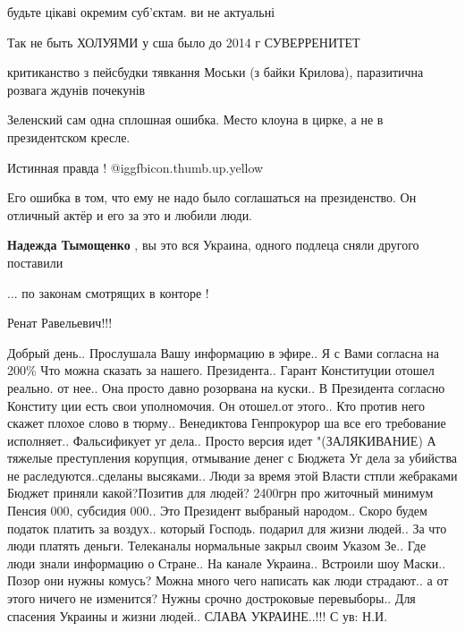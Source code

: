 \begin{itemize}
будьте цікаві окремим суб'єктам. ви не актуальні

Так не быть ХОЛУЯМИ у сша было до 2014 г СУВЕРРЕНИТЕТ

критиканство з пейсбудки тявкання Моськи (з байки Крилова), паразитична розвага ждунів почекунів

Зеленский сам одна сплошная ошибка. Место клоуна в цирке, а не в президентском кресле.

Истинная правда ! @igg{fbicon.thumb.up.yellow} 


Его ошибка в том, что ему не надо было соглашаться на президенство. Он отличный
актёр и его за это и любили люди.

\begin{itemize} %
\textbf{Надежда Тымощенко} , вы это вся Украина, одного подлеца сняли другого поставили
\end{itemize} %

... по законам смотрящих в конторе !

Ренат Равельевич!!!

Добрый день.. Прослушала Вашу информацию в эфире.. Я с Вами согласна на 200\%
Что можна сказать за нашего. Президента.. Гарант Конституции отошел реально.
от нее.. Она просто давно розорвана на куски.. В Президента согласно Конститу
ции есть свои уполномочия. Он отошел.от этого.. Кто против него скажет плохое
слово в тюрму.. Венедиктова Генпрокурор ша все его требование исполняет..
Фальсификует уг дела..  Просто версия идет "(ЗАЛЯКИВАНИЕ) А тяжелые
преступления корупция, отмывание денег с Бюджета Уг дела за убийства не
раследуются..сделаны высяками..  Люди за время этой Власти стпли жебраками
Бюджет приняли какой?Позитив для людей? 2400грн про житочный минимум Пенсия
000, субсидия 000.. Это Президент выбраный народом..  Скоро будем податок
платить за воздух.. который Господь. подарил для жизни людей..  За что люди
платять деньги. Телеканалы нормальные закрыл своим Указом Зе.. Где люди знали
информацию о Стране.. На канале Украина.. Встроили шоу Маски.. Позор они нужны
комусь?  Можна много чего написать как люди страдают.. а от этого ничего не
изменится? Нужны срочно достроковые перевыборы..  Для спасения Украины и жизни
людей..  СЛАВА УКРАИНЕ..!!!  С ув: Н.И.



\end{itemize}
